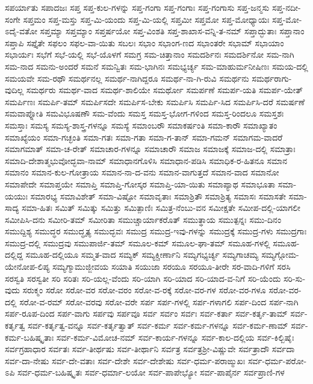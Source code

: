 {ಸಪರ್ಯಾತು
ಸಪಾದಜಃ
ಸಪ್ತ
ಸಪ್ತ-ಕುಲ-ಗಳನ್ನು
ಸಪ್ತ-ಗಂಗಾ
ಸಪ್ತ-ಗಂಗಾಃ
ಸಪ್ತ-ಗಂಗಾಸು
ಸಪ್ತ-ಜನ್ಮಸು
ಸಪ್ತ-ನದೀ-ಸಂಗೇ
ಸಪ್ತಮಂ
ಸಪ್ತ-ಮಸ್ತು
ಸಪ್ತ-ಮಿ-ಯಂದು
ಸಪ್ತ-ಮಿ-ಯಲ್ಲಿ
ಸಪ್ತಮೀ
ಸಪ್ತಮೋ
ಸಪ್ತ-ಮೋಧ್ಯಾಯಃ
ಸಪ್ತ-ಮೋ-ಽದೈ-ವತೋ
ಸಪ್ತಮ್ಯಾ
ಸಪ್ತಮ್ಯಾಂ
ಸಪ್ತರ್ಷಯೋ
ಸಪ್ತ-ವಿಂಶತಿ
ಸಪ್ತ-ಶಾಖಾಸ-ವನ್ನಿ-ತ-ನಮ್
ಸಪ್ತಾದ್ಭುತಾಃ
ಸಪ್ತಾನಾಂ
ಸಪ್ತಾಪಿ
ಸಪ್ತೈತೇ
ಸಫಲಂ
ಸಫಲ-ವಾ-ಯಿತು
ಸಬಲಃ
ಸಭಾಂ
ಸಭಾಂಗ-ಣದ
ಸಭಾಂತರೇ
ಸಭಾಮ್
ಸಭಾಯಾಂ
ಸಭಾರ್ಯಃ
ಸಭೆಗೆ
ಸಭೆ-ಯಲ್ಲಿ
ಸಭೆ-ಯೊಳಗೆ
ಸಮಗ್ರ
ಸಮ-ಚಿತ್ತಾನಾಂ
ಸಮದರ್ಶಿನಃ
ಸಮದರ್ಶಿನೋ
ಸಮ-ನಾಗಿ
ಸಮ-ನಾದ
ಸಮನು-ಅಂದರೆ
ಸಮನೆ
ಸಮನ್ವಿತಃ
ಸಮ-ಭಾಗಿನಃ
ಸಮಭ್ಯರ್ಚ್ಯ
ಸಮ-ಮಾಹುರ್ಮನೀಷಿಣಃ
ಸಮಯ-ದಲ್ಲಿ
ಸಮಯವೇ
ಸಮ-ರಥೌ
ಸಮರ್ಥನಲ್ಲ
ಸಮರ್ಥ-ನಾಗಿದ್ದರೂ
ಸಮರ್ಥ-ನಾ-ಗಿ-ರುವಿ
ಸಮರ್ಥನು
ಸಮರ್ಥರಾಗು-ವುದಿಲ್ಲ
ಸಮರ್ಥರು
ಸಮರ್ಥ-ವಾದ
ಸಮರ್ಥ-ಶಾಲಿಯೇ
ಸಮರ್ಥೋ
ಸಮರ್ಪಣೆ
ಸಮರ್ಪ-ಯತಿ
ಸಮರ್ಪ-ಯೇತ್
ಸಮರ್ಪಿಣಃ
ಸಮರ್ಪಿ-ತಮ್
ಸಮರ್ಪಿಸದೇ
ಸಮರ್ಪಿಸ-ಬೇಕು
ಸಮರ್ಪಿಸಿ
ಸಮರ್ಪಿ-ಸಿದ
ಸಮರ್ಪಿಸಿ-ದರೆ
ಸಮರ್ಷಣೆ
ಸಮವಾಪ್ನೋತಿ
ಸಮವಿಭೂಷಣೌ
ಸಮ-ವೆಂದು
ಸಮಸ್ತ
ಸಮಸ್ತ-ಭೋಗ-ಗಳಿಂದ
ಸಮಸ್ತ-ರಿಂದಲೂ
ಸಮಸ್ತಶಃ
ಸಮಸ್ತಾಃ
ಸಮಸ್ಯ
ಸಮಸ್ಯ-ಶಾಸ್ತ್ರ-ಗಳನ್ನೂ
ಸಮಸ್ಯೆ
ಸಮಾಂಬರೌ
ಸಮಾಕರ್ಷಂತಿ
ಸಮಾ-ಕಾರೌ
ಸಮಾಖ್ಯಾತಂ
ಸಮಾಖ್ಯೆಯಂ
ಸಮಾ-ಗಚ್ಛಂತಿ
ಸಮಾ-ಗತಃ
ಸಮಾ-ಗತಾ
ಸಮಾ-ಗ-ತಾನ್
ಸಮಾ-ಗಮನ್
ಸಮಾಗಮ-ವಾದರೆ
ಸಮಾಗಮಾತ್
ಸಮಾ-ಚ-ರೇತ್
ಸಮಾಚಾರ-ಗಳನ್ನೂ
ಸಮಾಚಾರೌ
ಸಮಾಜ
ಸಮಾಜಕ್ಕೆ
ಸಮಾಜ-ದಲ್ಲಿ
ಸಮಾತ್ರಾಃ
ಸಮಾದಿ-ದೇಶಾತ್ಮಭುವೋದ್ಭವಾ-ನಾಮ್
ಸಮಾಧಾನಗೊಳಿಸಿ
ಸಮಾಧಾನ-ಪಡಿಸಿ
ಸಮಾಧಿಕ-ರ-ಹಿತನೂ
ಸಮಾನ
ಸಮಾನಂ
ಸಮಾನ-ಕುಲ-ಗೋತ್ರಾಯ
ಸಮಾನ-ನಾ-ದ-ವನು
ಸಮಾನ-ವಾಗುತ್ತದೆ
ಸಮಾನ-ವಾದ
ಸಮಾನೋ
ಸಮಾಪೇದೇ
ಸಮಾಪ್ತಯೇ
ಸಮಾಪ್ತಿ
ಸಮಾಪ್ತಿ-ಗೋಸ್ಕರ
ಸಮಾಪ್ತಿ-ಯಾ-ಯಿತು
ಸಮಾಪ್ಯಾಥ
ಸಮಾಭೂತಾ
ಸಮಾ-ಯಯುಃ
ಸಮಾರಭ್ಯ
ಸಮಾವಿಶೇತ್
ಸಮಾ-ವಿಷ್ಟೋ
ಸಮಾವೃತಾಃ
ಸಮಾಶ್ರಿತೌ
ಸಮಾಶ್ರಿತ್ಯ
ಸಮಾಸಃ
ಸಮಾಸತೇ
ಸಮಾ-ಸಾದ್ಯ
ಸಮಾ-ಹಿತಃ
ಸಮಿತ್
ಸಮಿತ್ಕು
ಸಮಿತ್ತು
ಸಮಿತ್ಪಾಣಿಃ
ಸಮಿತ್ರ-ನೆಂಬು-ವನ
ಸಮೀಕ್ಷತೇ
ಸಮೀಪ-ದಲ್ಲಿ-ಯಾಗಲೀ
ಸಮೀಪಿಸಿ-ದನು
ಸಮೀರಿ-ತಮ್
ಸಮೀರಿತಾ
ಸಮುಚ್ಚಾರ್ಯಾಕರೊತ್
ಸಮುತ್ಥಾಯ
ಸಮುತ್ಪನ್ನಃ
ಸಮು-ದಿನಂ
ಸಮುದ್ದಿಶ್ಯ
ಸಮುದ್ಧರ
ಸಮುದ್ಧೃತ್ಯ
ಸಮುದ್ಭವಃ
ಸಮುದ್ರ
ಸಮುದ್ರ-ಇವು-ಗಳನ್ನು
ಸಮುದ್ರಕ್ಕೆ
ಸಮುದ್ರ-ಗಳು
ಸಮುದ್ರಗಾಃ
ಸಮುದ್ರ-ದಲ್ಲಿ
ಸಮುದ್ರವು
ಸಮುಪಾರ್ಜಿ-ತಮ್
ಸಮೂಲ-ಕಮ್
ಸಮೂಲ-ಘಾ-ತಮ್
ಸಮೂಹ-ಗಳಲ್ಲಿ
ಸಮೂಹ-ದಲ್ಲಿದ್ದ
ಸಮೂಹ-ದಲ್ಲಿಯೂ
ಸಮ್ಮತ-ವಾದ
ಸಮ್ಯಕ್
ಸಮ್ಯಕ್ಚೀರ್ಣಾನಿ
ಸಮ್ಯಗಭ್ಯರ್ಚ್ಯ
ಸಮ್ಯಗಾಚಮ್ಯ
ಸಮ್ಯಗ್ಗೋಮ-ಯೇನೋಪ-ಲಿಪ್ಯ
ಸಮ್ಯಗ್ಮಾಮುಜ್ಜೀವಯ
ಸಯಾತಿ
ಸಯುಜಾ
ಸರಯೂ
ಸರಯೂ-ತೀರೇ
ಸರ-ವಾದಿ-ಗಳಿಗೆ
ಸರಸಿ
ಸರಸ್ವತಿ
ಸರಸ್ವತೀ
ಸರಿ
ಸರಿತಃ
ಸರಿ-ಯಲ್ಲ-ವೆಂದು
ಸರಿ-ಯಾಗಿ
ಸರಿ-ಯಾದ
ಸರಿ-ಯಾದ-ವ-ನಿಗೆ
ಸರಿ-ಯೆಂದು
ಸರಿ-ಸು-ವುದು
ಸರುಕ್ಮಂ
ಸರೋ
ಸರೋ-ವರ
ಸರೋ-ವರಂ
ಸರೋ-ವ-ರಕ್ಕೆ
ಸರೋ-ವರ-ಗಳ
ಸರೋ-ವರ-ಗಳೂ
ಸರೋ-ವರ-ದಲ್ಲಿ
ಸರೋ-ವ-ರಮ್
ಸರೋ-ವರವು
ಸರೋ-ವರೇ
ಸರ್ಪ
ಸರ್ಪ-ಗಳಲ್ಲಿ
ಸರ್ಪ-ಗಳಾಗಲಿ
ಸರ್ಪ-ದಿಂದ
ಸರ್ಪ-ನಾಗಿ
ಸರ್ಪ-ರೂಪ-ದಿಂದ
ಸರ್ಪ-ವಾಗು
ಸರ್ಪವು
ಸರ್ಪವೂ
ಸರ್ವ
ಸರ್ವಂ
ಸರ್ವಃ
ಸರ್ವ-ಕರ್ತಾ
ಸರ್ವ-ಕರ್ತೃ-ತಾಮ್
ಸರ್ವ-ಕರ್ತೃತ್ವ
ಸರ್ವ-ಕರ್ತೃತ್ವ-ವನ್ನೂ
ಸರ್ವ-ಕರ್ತೃತ್ವಾತ್
ಸರ್ವ-ಕರ್ಮ
ಸರ್ವ-ಕರ್ಮ-ಗಳನ್ನೂ
ಸರ್ವ-ಕರ್ಮ-ಣಾಮ್
ಸರ್ವ-ಕರ್ಮ-ಬಹಿಷ್ಕೃತಾಃ
ಸರ್ವ-ಕರ್ಮ-ವಿಮೋಚ-ನಮ್
ಸರ್ವ-ಕಾರ್ಯ-ಗಳನ್ನೂ
ಸರ್ವ-ಕಾಲ-ದಲ್ಲಿಯ
ಸರ್ವ-ಕಿಲ್ಬಿಷೈಃ
ಸರ್ವಗ್ರಹಾಧಾರ
ಸರ್ವತಃ
ಸರ್ವ-ತೀರ್ಥಷು
ಸರ್ವ-ತೀರ್ಥಾನಿ
ಸರ್ವತ್ರ
ಸರ್ವತ್ರಶ್ರೀ-ವಿಷ್ಣುವೇ
ಸರ್ವತ್ರಾದೌ
ಸರ್ವದಾ
ಸರ್ವ-ದಾ-ನೇಷು
ಸರ್ವ-ದೇ-ವತಾಃ
ಸರ್ವ-ದೇಶೇ
ಸರ್ವ-ದೇಶೇಷು
ಸರ್ವ-ಧರ್ಮ-ಪರಾಙ್ಮುಖಃ
ಸರ್ವ-ಧರ್ಮ-ಪರೋ-ಽಪಿ
ಸರ್ವ-ಧರ್ಮ-ಬಹಿಷ್ಕೃತಃ
ಸರ್ವ-ಧರ್ಮಾ-ಲಯೋ
ಸರ್ವ-ಪಾಪೇಭ್ಯೋ
ಸರ್ವ-ಪಾಪೈರ್ನ
ಸರ್ವಪ್ರಾಣಿ-ಗಳ
}
